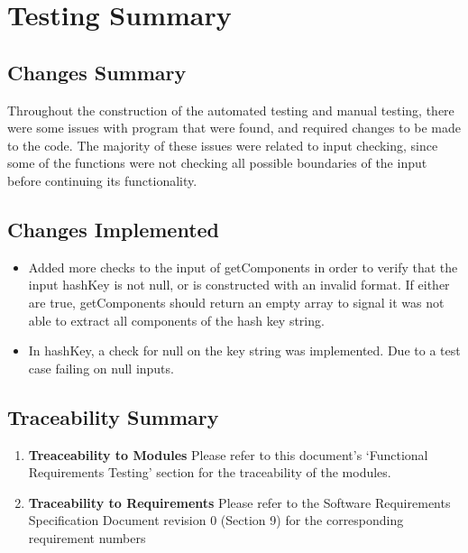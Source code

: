 \documentclass[12pt]{article}
\begin{document}
\section{Testing Summary}

\subsection{Changes Summary}
Throughout the construction of the automated testing and manual testing, there were some issues with program that were found, and required changes to be made to the code. The majority of these issues were related to input checking, since some of the functions were not checking all possible boundaries of the input before continuing its functionality.

\subsection{Changes Implemented}
  \begin{itemize}
    \item Added more checks to the input of getComponents in order to verify that the input hashKey is not null, or is constructed with an invalid format. If either are true, getComponents should return an empty array to signal it was not able to extract all components of the hash key string.

    \item In hashKey, a check for null on the key string was implemented. Due to a test case failing on null inputs.

  \end{itemize}

\subsection{Traceability Summary}
  \begin{enumerate}
  \item \textbf{Treaceability to Modules} \newline Please refer to this document’s `Functional Requirements Testing' section for the traceability of the modules.

  \item \textbf{Traceability to Requirements} \newline Please refer to the Software Requirements Specification Document revision 0 (Section 9) for the corresponding requirement numbers

  \end{enumerate}
\end{document}
